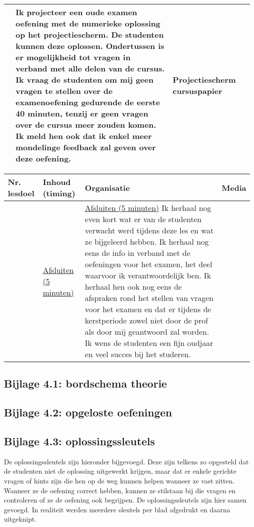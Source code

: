 \begin{landscape}
\begin{tabularx}{1.56\textwidth}{|p{1.5cm}|p{6cm}|X|p{4cm}|}
	&  Ik projecteer een oude examen oefening met de numerieke oplossing op het projectiescherm. De studenten kunnen deze oplossen. Ondertussen is er mogelijkheid tot vragen in verband met alle delen van de cursus. Ik vraag de studenten om mij geen vragen te stellen over de examenoefening gedurende de eerste 40 minuten, tenzij er geen vragen over de cursus meer zouden komen. Ik meld hen ook dat ik enkel meer mondelinge feedback zal geven over deze oefening. 
	& Projectiescherm \newline cursuspapier 
	\\ \hline
\end{tabularx}


	
\begin{tabularx}{1.56\textwidth}{|p{1.5cm}|p{6cm}|X|p{4cm}|}
	\hline
	\textbf{Nr. lesdoel } & \textbf{Inhoud (timing)}  & \textbf{Organisatie } & \textbf{Media } \\ \hline
	&\underline{Afsluiten (5 minuten)}\newline 
	&  \underline{Afsluiten (5 minuten)}\newline
	Ik herhaal nog even kort wat er van de studenten verwacht werd tijdens deze les en wat ze bijgeleerd hebben. Ik herhaal nog eens de info in verband met de oefeningen voor het examen, het deel waarvoor ik verantwoordelijk ben. Ik herhaal hen ook nog eens de afspraken rond het stellen van vragen voor het examen en dat er tijdens de kerstperiode zowel niet door de prof als door mij geantwoord zal worden.  Ik wens de studenten een fijn oudjaar en veel succes bij het studeren.
	& 
	\\ \hline
\end{tabularx}
	
	
	
	
	
	
	
\end{landscape}


\subsection*{Bijlage 4.1: bordschema theorie}
\subsection*{Bijlage 4.2: opgeloste oefeningen}


\subsection*{Bijlage 4.3: oplossingssleutels}
De oplossingssleutels zijn hieronder bijgevoegd. Deze zijn telkens zo opgesteld dat de studenten niet de oplossing uitgewerkt krijgen, maar dat er enkele gerichte vragen of hints zijn die hen op de weg kunnen helpen wanneer ze vast zitten. Wanneer ze de oefening correct hebben, kunnen ze stilstaan bij die vragen en controleren of ze de oefening ook begrijpen.\newline
De oplossingssleutels zijn hier samen gevoegd. In realiteit werden meerdere sleutels per blad afgedrukt en daarna uitgeknipt.

